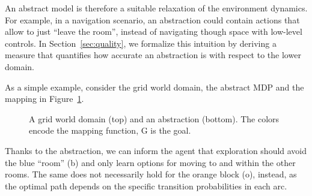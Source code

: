 \documentclass[letterpaper]{article} %
\theoremstyle{plain}
\theoremstyle{definition}
\theoremstyle{remark}
\begin{document}
An abstract model is therefore a suitable relaxation of the
environment dynamics. For example, in a navigation scenario, an abstraction could
contain actions that allow to just ``leave the room'', instead of navigating though
space with low-level controls.
In Section~\ref{sec:quality}, we formalize this intuition by deriving a measure that quantifies how accurate an abstraction is with respect to the lower domain.

As a simple example, consider the grid world domain, the abstract MDP and the mapping in Figure~\ref{fig:rooms8}.
\begin{figure}
\centering
{}
\caption{A grid world domain (top) and an abstraction (bottom). The colors encode the mapping function, G is the goal.}
\label{fig:rooms8}
\end{figure}
Thanks to the abstraction, we can inform the agent that exploration should avoid the blue ``room'' (b) and only learn options for moving to and within the other rooms.
The same does not necessarily hold for the orange block (o), instead,
as the optimal path depends on the specific transition probabilities in each arc.
\end{document}
